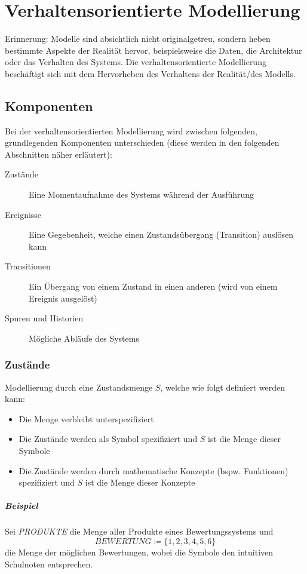 \chapter{Verhaltensorientierte Modellierung}
    Erinnerung: Modelle sind absichtlich nicht originalgetreu, sondern heben bestimmte Aspekte der Realität hervor, beispielsweise die Daten, die Architektur oder das Verhalten des Systems. Die verhaltensorientierte Modellierung beschäftigt sich mit dem Hervorheben des Verhaltens der Realität/des Modells.

    \section{Komponenten}
	    Bei der verhaltensorientierten Modellierung wird zwischen folgenden, grundlegenden Komponenten unterschieden (diese werden in den folgenden Abschnitten näher erläutert):
	    \begin{description}
	    	\item[Zustände] Eine Momentaufnahme des Systems während der Ausführung
	    	\item[Ereignisse] Eine Gegebenheit, welche einen Zustandsübergang (Transition) auslösen kann
	    	\item[Transitionen] Ein Übergang von einem Zustand in einen anderen (wird von einem Ereignis ausgelöst)
	    	\item[Spuren und Historien] Mögliche Abläufe des Systems
	    \end{description}
	    
	    \subsection{Zustände}
			Modellierung durch eine Zustandsmenge $ S $, welche wie folgt definiert werden kann:
			\begin{itemize}
				\item Die Menge verbleibt unterspezifiziert
				\item Die Zustände werden als Symbol spezifiziert und $ S $ ist die Menge dieser Symbole
				\item Die Zustände werden durch mathematische Konzepte (bspw. Funktionen) spezifiziert und $ S $ ist die Menge dieser Konzepte
			\end{itemize}
			
			\paragraph{Beispiel}
				Sei \textit{PRODUKTE} die Menge aller Produkte eines Bewertungssystems und \[ \textit{BEWERTUNG} \coloneqq \{ 1, 2, 3, 4, 5, 6 \} \] die Menge der möglichen Bewertungen, wobei die Symbole den intuitiven Schulnoten entsprechen.
				
